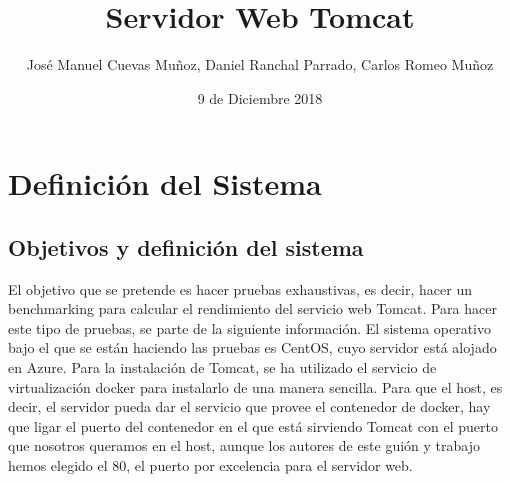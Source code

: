 \documentclass[11pt,twoside,a4paper]{book}
\title{\Huge Servidor Web Tomcat}
\author{José Manuel Cuevas Muñoz, Daniel Ranchal Parrado, Carlos Romeo Muñoz}
\date{9 de Diciembre 2018}
\begin{document}
\maketitle
%
%

\renewcommand\bibname{Bibliografía}
\renewcommand\tablename{Tabla}

 \fancyhf{} \pagestyle{fancy}
\fancyhead[LO]{\rightmark} %
\fancyhead[RE]{\leftmark} %
\fancyhead[RO,LE]{\thepage} %
\setlength{\headheight}{14pt}
\renewcommand{\sectionmark}[1]{\markright{{\thesection. #1}}} %
\tableofcontents
%
%

\chapter{Definición del Sistema}
\section{Objetivos y definición del sistema}
El objetivo que se pretende es hacer pruebas exhaustivas, es decir, hacer un benchmarking para calcular el rendimiento del servicio web Tomcat. Para hacer este tipo de pruebas, se parte de la siguiente información.
El sistema operativo bajo el que se están haciendo las pruebas es CentOS, cuyo servidor está alojado en Azure.
\newline
Para la instalación de Tomcat, se ha utilizado el servicio de virtualización docker para instalarlo de una manera sencilla. Para que el host, es decir, el servidor pueda dar el servicio que provee el contenedor de docker, hay que ligar el puerto del contenedor en el que está sirviendo Tomcat con el puerto que nosotros queramos en el host, aunque los autores de este guión y trabajo hemos elegido el 80, el puerto por excelencia para el servidor web.
\end{document}
